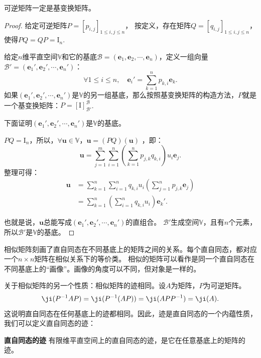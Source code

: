 \documentclass[12pt,UTF8,fontset=none]{ctexbook}
\begin{document}
\begin{pp}\label{pp:5_2}
    可逆矩阵一定是基变换矩阵。
\end{pp}
\begin{proof} %
给定可逆矩阵$P = [p_{i,j}]_{1\leqslant i , j \leqslant n}$，
按定义，存在矩阵$Q = [q_{i,j}]_{1\leqslant i , j \leqslant n}$，
使得$PQ = QP = \mathrm{I}_n$.

给定$n$维平直空间$\mathbb{V}$和它的基底$\mathcal{B} = (\mathbf{e}_1, \mathbf{e}_2, \cdots , \mathbf{e}_n)$，定义一组向量$\mathcal{B}' = (\mathbf{e}_1', \mathbf{e}_2', \cdots , \mathbf{e}_n')$：
$$\forall 1 \leqslant i \leqslant n, \quad \mathbf{e}_i' = \sum_{k=1}^n p_{k,i} \mathbf{e}_k.$$
如果$(\mathbf{e}_1', \mathbf{e}_2', \cdots , \mathbf{e}_n')$是$\mathbb{V}$的另一组基底，那么按照基变换矩阵的构造方法，$P$就是一个基变换矩阵：$P = [\mathrm{I}]_{\mathcal{B}'}^{\mathcal{B}}$.

下面证明$(\mathbf{e}_1', \mathbf{e}_2', \cdots , \mathbf{e}_n')$是$\mathbb{V}$的基底。

$PQ = \mathrm{I}_n$，所以，$\forall \mathbf{u} \in \mathbb{V}$，$\mathbf{u} = (PQ)(\mathbf{u})$ ，即：
$$\mathbf{u} = \sum_{j=1}^m \sum_{i=1}^n \left(\sum_{k=1}^n p_{j,k} q_{k, i} \right) u_i \mathbf{e}_j.$$
整理可得：
\begin{align*}
    \mathbf{u} &= \sum_{k=1}^n \sum_{i=1}^n q_{k, i}  u_i \left( \sum_{j=1}^n p_{j,k} \mathbf{e}_j\right)  \\
    &= \sum_{k=1}^n \left(\sum_{i=1}^n q_{k, i}  u_i\right) \mathbf{e}_k'. 
\end{align*}

也就是说，$\mathbf{u}$总能写成$(\mathbf{e}_1', \mathbf{e}_2', \cdots , \mathbf{e}_n')$的直组合。
$\mathcal{B}'$生成空间$\mathbb{V}$，且有$n$个元素，所以$\mathcal{B}'$是$\mathbb{V}$的基底。
\end{proof}

相似矩阵刻画了直自同态在不同基底上的矩阵之间的关系。每个直自同态，都对应一个$n\times n$矩阵在相似关系下的等价类。
相似的矩阵可以看作是同一个直自同态在不同基底上的“画像”。画像的角度可以不同，但对象是一样的。

关于相似矩阵的另一个性质：相似矩阵的迹相同。设$A$为矩阵，$P$为可逆矩阵。
$$ \ji(P^{-1}AP) = \ji(P^{-1}(AP)) = \ji(APP^{-1}) = \ji(A). $$
这说明直自同态在任何基底上的迹都相同。因此，迹是直自同态的一个内蕴性质，我们可以定义直自同态的迹：
\begin{df}{\textbf{直自同态的迹}}
    有限维平直空间上的直自同态的迹，是它在任意基底上的矩阵的迹。
\end{df}
\end{document}
